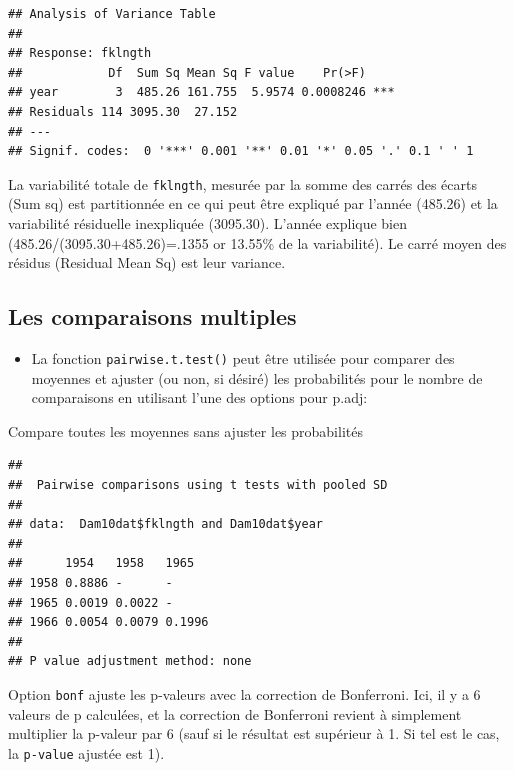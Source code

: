\documentclass[
  12pt,
]{book}
\newenvironment{Shaded}{\begin{snugshade}}{\end{snugshade}}
\newcommand{\DataTypeTok}[1]{\textcolor[rgb]{0.13,0.29,0.53}{#1}}
\newcommand{\KeywordTok}[1]{\textcolor[rgb]{0.13,0.29,0.53}{\textbf{#1}}}
\newcommand{\NormalTok}[1]{#1}
\newcommand{\OperatorTok}[1]{\textcolor[rgb]{0.81,0.36,0.00}{\textbf{#1}}}
\newcommand{\StringTok}[1]{\textcolor[rgb]{0.31,0.60,0.02}{#1}}
\providecommand{\tightlist}{%
  \setlength{\itemsep}{0pt}\setlength{\parskip}{0pt}}
\begin{document}
\begin{verbatim}
## Analysis of Variance Table
## 
## Response: fklngth
##            Df  Sum Sq Mean Sq F value    Pr(>F)    
## year        3  485.26 161.755  5.9574 0.0008246 ***
## Residuals 114 3095.30  27.152                      
## ---
## Signif. codes:  0 '***' 0.001 '**' 0.01 '*' 0.05 '.' 0.1 ' ' 1
\end{verbatim}

La variabilité totale de \texttt{fklngth}, mesurée par la somme des carrés des écarts (Sum sq) est partitionnée en ce qui peut être expliqué par l'année (485.26) et la variabilité résiduelle inexpliquée (3095.30). L'année explique bien (485.26/(3095.30+485.26)=.1355 or 13.55\% de la variabilité). Le carré moyen des résidus (Residual Mean Sq) est leur variance.

\hypertarget{les-comparaisons-multiples}{%
\subsection{Les comparaisons multiples}\label{les-comparaisons-multiples}}

\begin{itemize}
\tightlist
\item
  La fonction \texttt{pairwise.t.test()} peut être utilisée pour comparer des moyennes et ajuster (ou non, si désiré) les probabilités pour le nombre de comparaisons en utilisant l'une des options pour p.adj:
\end{itemize}

Compare toutes les moyennes sans ajuster les probabilités

\begin{Shaded}
\end{Shaded}

\begin{verbatim}
## 
##  Pairwise comparisons using t tests with pooled SD 
## 
## data:  Dam10dat$fklngth and Dam10dat$year 
## 
##      1954   1958   1965  
## 1958 0.8886 -      -     
## 1965 0.0019 0.0022 -     
## 1966 0.0054 0.0079 0.1996
## 
## P value adjustment method: none
\end{verbatim}

Option \texttt{bonf} ajuste les p-valeurs avec la correction de Bonferroni. Ici, il y a 6 valeurs de p calculées, et la correction de Bonferroni revient à simplement multiplier la p-valeur par 6 (sauf si le résultat est supérieur à 1. Si tel est le cas, la \texttt{p-value} ajustée est 1).
\end{document}
